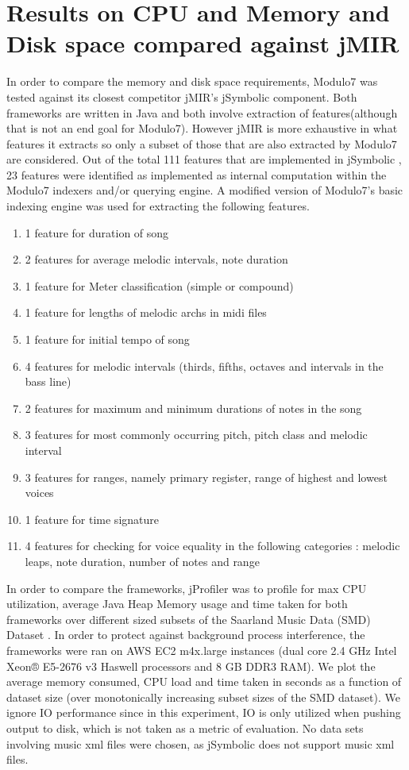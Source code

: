 \section{Results on CPU and Memory and Disk space compared against jMIR} \label{vsjmir}

\noindent In order to compare the memory and disk space requirements, Modulo7 was tested against its closest competitor jMIR's \cite{jMIR} jSymbolic component. Both frameworks are written in Java and both involve extraction of features(although that is not an end goal for Modulo7). However jMIR is more exhaustive in what features it extracts so only a subset of those that are also extracted by Modulo7 are considered. Out of the total 111 features that are implemented in jSymbolic \cite{jSymbolic}, 23 features were identified as implemented as internal computation within the Modulo7 indexers and/or querying engine. A modified version of Modulo7's basic indexing engine was used for extracting the following features. 
\begin{enumerate}
\item 1 feature for duration of song
\item 2 features for average melodic intervals, note duration
\item 1 feature for Meter classification (simple or compound)
\item 1 feature for lengths of melodic archs in midi files
\item 1 feature for initial tempo of song
\item 4 features for melodic intervals (thirds, fifths, octaves and intervals in the bass line)
\item 2 features for maximum and minimum durations of notes in the song
\item 3 features for most commonly occurring pitch, pitch class and melodic interval
\item 3 features for ranges, namely primary register, range of highest and lowest voices
\item 1 feature for time signature
\item 4 features for checking for voice equality in the following categories : melodic leaps, note duration, number of notes and range \\
\end{enumerate}
\noindent In order to compare the frameworks, jProfiler was to profile for max CPU utilization, average Java Heap Memory usage and time taken for both frameworks over different sized subsets of the Saarland Music Data (SMD) Dataset \cite{saarlandmsd}. In order to protect against background process interference, the frameworks were ran on AWS EC2 m4x.large instances (dual core 2.4 GHz Intel Xeon® E5-2676 v3 Haswell processors and 8 GB DDR3 RAM). We plot the average memory consumed, CPU load and time taken in seconds as a function of dataset size (over monotonically increasing subset sizes of the SMD dataset). We ignore IO performance since in this experiment, IO is only utilized when pushing output to disk, which is not taken as a metric of evaluation. No data sets involving music xml files were chosen, as jSymbolic does not support music xml files.\\ 

